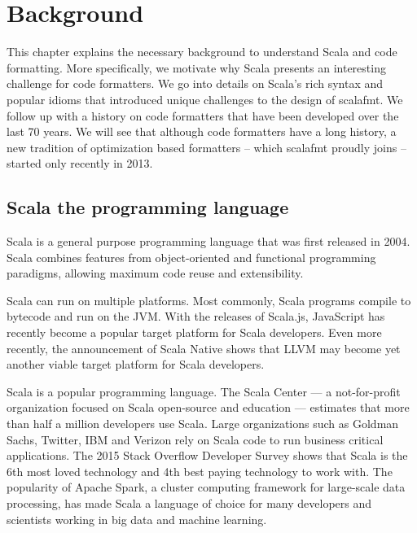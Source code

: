 \newcommand{\naive}{na\"{\i}ve}
\newcommand{\dartfmt}{\texttt{dartfmt}}
\newcommand{\gofmt}{\texttt{gofmt}}
\newcommand{\rfmt}{\texttt{rfmt}}
\section{Background}
This chapter explains the necessary background to understand Scala and code formatting.
More specifically, we motivate why Scala presents an interesting challenge for code formatters.
We go into details on Scala's rich syntax and popular idioms that introduced unique challenges to the design of scalafmt.
We follow up with a history on code formatters that have been developed over the last 70 years.
We will see that although code formatters have a long history, a new tradition of optimization based formatters -- which scalafmt proudly joins -- started only recently in 2013.

\subsection{Scala the programming language}\label{sec:scala}
Scala\autocite{odersky_scala_2004} is a general purpose programming language that was first released in 2004.
Scala combines features from object-oriented and functional programming paradigms, allowing maximum code reuse and extensibility.

Scala can run on multiple platforms.
Most commonly, Scala programs compile to bytecode and run on the JVM.
With the releases of Scala.js\autocite{doeraene_scala.js_2015}, JavaScript has recently become a popular target platform for Scala developers.
Even more recently, the announcement of Scala Native\autocite{_scala-native/scala-native_????} shows that LLVM may become yet another viable target platform for Scala developers.

Scala is a popular programming language.
The Scala Center --- a not-for-profit organization focused on Scala open-source and education --- estimates that more than half a million developers use Scala\autocite{odersky_scala_2016}.
Large organizations such as Goldman Sachs, Twitter, IBM and Verizon rely on Scala code to run business critical applications.
The 2015 Stack Overflow Developer Survey shows that Scala is the 6th most loved technology and 4th best paying technology to work with\autocite{_stack_????}.
The popularity of Apache Spark\autocite{_apache_????-1}, a cluster computing framework for large-scale data processing, has made Scala a language of choice for many developers and scientists working in big data and machine learning.

